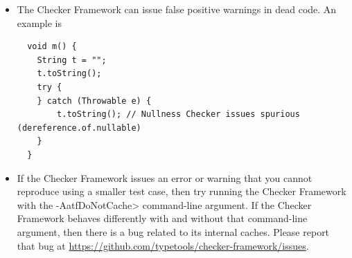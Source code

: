\begin{itemize}
\begin{smaller}
\begin{Verbatim}
public String(char value[], @IndexFor("value") int offset, @IndexOrHigh("value") int count) { ... }
\end{Verbatim}
\end{smaller}

\noindent
you will get an error such as

\begin{smaller}
\begin{Verbatim}[]
[expression.unparsable] Expression in dependent type annotation invalid:
Use "#1" rather than "value"
\end{Verbatim}
\end{smaller}

Section~\ref{java-expressions-as-arguments} explains that you need to use
a different syntax to refer to a formal parameter:

\begin{smaller}
\begin{Verbatim}
public String(char value[], @IndexFor("#1") int offset, @IndexOrHigh("#1") int count) { ... }
\end{Verbatim}
\end{smaller}


\item
\label{false-positive-in-dead-code}
  The Checker Framework can issue false positive warnings in dead code.  An
  example is

\begin{smaller}
\begin{Verbatim}
  void m() {
    String t = "";
    t.toString();
    try {
    } catch (Throwable e) {
        t.toString(); // Nullness Checker issues spurious (dereference.of.nullable)
    }
  }
\end{Verbatim}
\end{smaller}

\item
  If the Checker Framework issues an error or warning that you cannot
  reproduce using a smaller test case, then try running the Checker
  Framework with the \<-AatfDoNotCache> command-line argument.  If the
  Checker Framework behaves differently with and without that command-line
  argument, then there is a bug related to its internal caches.  Please
  report that bug at
  \url{https://github.com/typetools/checker-framework/issues}.

\end{itemize}


